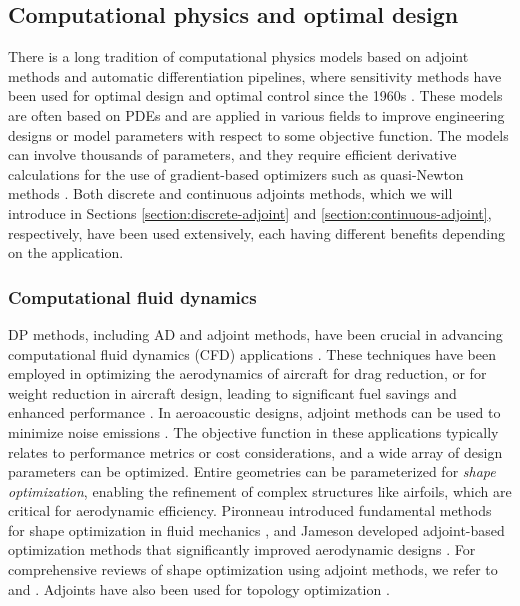 
\subsection{Computational physics and optimal design}

There is a long tradition of computational physics models based on adjoint methods and automatic differentiation pipelines, where sensitivity methods have been used for optimal design and optimal control since the 1960s \cite{lions1971optimal}. 
These models are often based on PDEs and are applied in various fields to improve engineering designs or model parameters with respect to some objective function. 
The models can involve thousands of parameters, and they require efficient derivative calculations for the use of gradient-based optimizers such as quasi-Newton methods \cite{nocedal1999numerical}. 
Both discrete and continuous adjoints methods, which we will introduce in Sections \ref{section:discrete-adjoint} and \ref{section:continuous-adjoint}, respectively, have been used extensively, each having different benefits depending on the application.

\subsubsection{Computational fluid dynamics}

DP methods, including AD and adjoint methods, have been crucial in advancing computational fluid dynamics (CFD) applications \cite{KENWAY2019100542}. 
These techniques have been employed in optimizing the aerodynamics of aircraft for drag reduction, or for weight reduction in aircraft design, leading to significant fuel savings and enhanced performance \cite{jameson2003aerodynamic}. 
In aeroacoustic designs, adjoint methods can be used to minimize noise emissions \cite{FREUND201054}. 
The objective function in these applications typically relates to performance metrics or cost considerations, and a wide array of design parameters can be optimized.
Entire geometries can be parameterized for \emph{shape optimization}, enabling the refinement of complex structures like airfoils, which are critical for aerodynamic efficiency. 
Pironneau introduced fundamental methods for shape optimization in fluid mechanics \cite{Pironneau_1974}, and Jameson developed adjoint-based optimization methods that significantly improved aerodynamic designs \cite{Jameson_1988}. 
For comprehensive reviews of shape optimization using adjoint methods, we refer to \cite{Giles_Pierce_2000} and \cite{mohammadi2009applied}. 
Adjoints have also been used for topology optimization \cite{allaire2014shape}.

